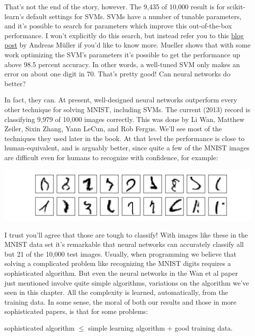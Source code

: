 \documentclass[a4paper,twoside,10pt]{book}
\begin{document}
That's not the end of the story, however. The 9,435 of 10,000 result is for scikit-learn's default settings for SVMs. SVMs have a number of tunable parameters, and it's possible to search for parameters which improve this out-of-the-box performance. I won't explicitly do this search, but instead refer you to this \href{http://peekaboo-vision.blogspot.de/2010/09/mnist-for-ever.html}{blog post} by Andreas M\"{u}ller if you'd like to know more. Mueller shows that with some work optimizing the SVM's parameters it's possible to get the performance up above 98.5 percent accuracy. In other words, a well-tuned SVM only makes an error on about one digit in 70. That's pretty good! Can neural networks do better?

In fact, they can. At present, well-designed neural networks outperform every other technique for solving MNIST, including SVMs. The current (2013) record is classifying 9,979 of 10,000 images correctly. This was done by Li Wan, Matthew Zeiler, Sixin Zhang, Yann LeCun, and Rob Fergus. We'll see most of the techniques they used later in the book. At that level the performance is close to human-equivalent, and is arguably better, since quite a few of the MNIST images are difficult even for humans to recognize with confidence, for example:
\begin{center}
	\includegraphics[scale=0.35]{./figures/ch1/mnist_really_bad_images}
\end{center}
I trust you'll agree that those are tough to classify! With images like these in the MNIST data set it's remarkable that neural networks can accurately classify all but 21 of the 10,000 test images. Usually, when programming we believe that solving a complicated problem like recognizing the MNIST digits requires a sophisticated algorithm. But even the neural networks in the Wan et al paper just mentioned involve quite simple algorithms, variations on the algorithm we've seen in this chapter. All the complexity is learned, automatically, from the training data. In some sense, the moral of both our results and those in more sophisticated papers, is that for some problems:
\begin{center}
sophisticated algorithm $\le$ simple learning algorithm + good training data.
\end{center}
\end{document}
